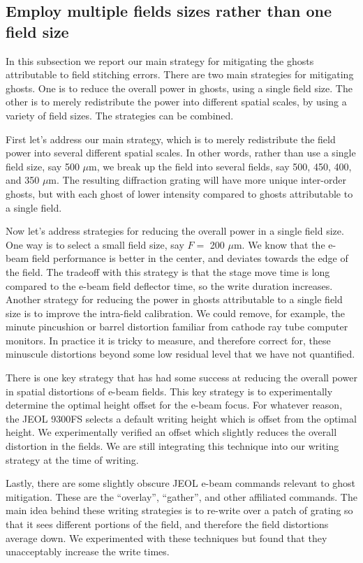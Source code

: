 \documentclass[]{spie}  %
\begin{document}
\subsection{Employ multiple fields sizes rather than one field size}
\label{sec:MultipleFields}
In this subsection we report our main strategy for mitigating the ghosts attributable to field stitching errors.  There are two main strategies for mitigating ghosts.  One is to reduce the overall power in ghosts, using a single field size.  The other is to merely redistribute the power into different spatial scales, by using a variety of field sizes.  The strategies can be combined.

First let's address our main strategy, which is to merely redistribute the field power into several different spatial scales.  In other words, rather than use a single field size, say 500 $\mu$m, we break up the field into several fields, say 500, 450, 400, and 350 $\mu$m.  The resulting diffraction grating will have more unique inter-order ghosts, but with each ghost of lower intensity compared to ghosts attributable to a single field.

Now let's address strategies for reducing the overall power in a single field size.  One way is to select a small field size, say $F=$ 200 $\mu$m.   We know that the e-beam field performance is better in the center, and deviates towards the edge of the field.  The tradeoff with this strategy is that the stage move time is long compared to the e-beam field deflector time, so the write duration increases.  Another strategy for reducing the power in ghosts attributable to a single field size is to improve the intra-field calibration.   We could remove, for example, the minute pincushion or barrel distortion familiar from cathode ray tube computer monitors.  In practice it is tricky to measure, and therefore correct for, these minuscule distortions beyond some low residual level that we have not quantified.  

There is one key strategy that has had some success at reducing the overall power in spatial distortions of e-beam fields.  This key strategy is to experimentally determine the optimal height offset for the e-beam focus.  For whatever reason, the JEOL 9300FS selects a default writing height which is offset from the optimal height.  We experimentally verified an offset which slightly reduces the overall distortion in the fields.  We are still integrating this technique into our writing strategy at the time of writing.

Lastly, there are some slightly obscure JEOL e-beam commands relevant to ghost mitigation.  These are the ``overlay'', ``gather'', and other affiliated commands.  The main idea behind these writing strategies is to re-write over a patch of grating so that it sees different portions of the field, and therefore the field distortions average down.  We experimented with these techniques but found that they unacceptably increase the write times.
\end{document}
